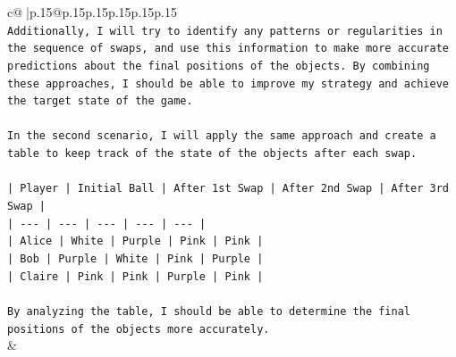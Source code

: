 \documentclass{article}
\begin{document}
{\begin{supertabular}{c@{$\;$}|p{.15\linewidth}@{}p{.15\linewidth}p{.15\linewidth}p{.15\linewidth}p{.15\linewidth}p{.15\linewidth}}
{{{\\ 
\texttt{Additionally, I will try to identify any patterns or regularities in the sequence of swaps, and use this information to make more accurate predictions about the final positions of the objects. By combining these approaches, I should be able to improve my strategy and achieve the target state of the game.} \\
\\ 
\texttt{In the second scenario, I will apply the same approach and create a table to keep track of the state of the objects after each swap.} \\
\\ 
\texttt{| Player | Initial Ball | After 1st Swap | After 2nd Swap | After 3rd Swap |} \\
\texttt{| {-}{-}{-} | {-}{-}{-} | {-}{-}{-} | {-}{-}{-} | {-}{-}{-} |} \\
\texttt{| Alice | White | Purple | Pink | Pink |} \\
\texttt{| Bob | Purple | White | Pink | Purple |} \\
\texttt{| Claire | Pink | Pink | Purple | Pink |} \\
\\ 
\texttt{By analyzing the table, I should be able to determine the final positions of the objects more accurately.} \\
            }
        }
    }
    & \\ \\

\end{supertabular}
}
\end{document}
